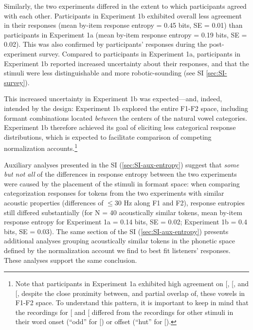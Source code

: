 \documentclass[preprint]{JASA}
\begin{document}
Similarly, the two experiments differed in the extent to which participants agreed with each other. Participants in Experiment 1b exhibited overall less agreement in their responses (mean by-item response entropy = 0.45 bits, SE = 0.01) than participants in Experiment 1a (mean by-item response entropy = 0.19 bits, SE = 0.02). This was also confirmed by participants' responses during the post-experiment survey. Compared to participants in Experiment 1a, participants in Experiment 1b reported increased uncertainty about their responses, and that the stimuli were less distinguishable and more robotic-sounding (see SI \ref{sec:SI-survey}).

This increased uncertainty in Experiment 1b was expected---and, indeed, intended by the design: Experiment 1b explored the entire F1-F2 space, including formant combinations located \emph{between} the centers of the natural vowel categories. Experiment 1b therefore achieved its goal of eliciting less categorical response distributions, which is expected to facilitate comparison of competing normalization accounts.\footnote{Note that participants in Experiment 1a exhibited high agreement on {[}\ipatext{ʌ}{]}, {[}\ipatext{æ}{]}, and {[}\ipatext{ɑ}{]}, despite the close proximity between, and partial overlap of, these vowels in F1-F2 space. To understand this pattern, it is important to keep in mind that the recordings for {[}\ipatext{ʌ}{]} and {[}\ipatext{ɑ}{]} differed from the recordings for other stimuli in their word onset (``odd'' for {[}\ipatext{ɑ}{]}) or offset (``hut'' for {[}\ipatext{ʌ}{]}).}

Auxiliary analyses presented in the SI (\ref{sec:SI-aux-entropy}) suggest that \emph{some but not all} of the differences in response entropy between the two experiments were caused by the placement of the stimuli in formant space: when comparing categorization responses for tokens from the two experiments with similar acoustic properties (differences of \(\le 30\) Hz along F1 and F2), response entropies still differed substantially (for N = 40 acoustically similar tokens, mean by-item response entropy for Experiment 1a = 0.14 bits, SE = 0.02; Experiment 1b = 0.4 bits, SE = 0.03). The same section of the SI (\ref{sec:SI-aux-entropy}) presents additional analyses grouping acoustically similar tokens in the phonetic space defined by the normalization account we find to best fit listeners' responses. These analyses support the same conclusion.
\end{document}
